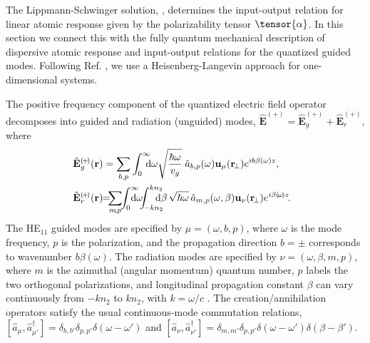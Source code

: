 \documentclass[aps,pra,twocolumn]{revtex4-1} %
\newcommand{\awg}{\hat{a}_{b,p}(\omega)}
\newcommand{\awr}{\hat{a}_{m,p}(\omega,\beta)}
\begin{document}
The Lippmann-Schwinger solution, , determines the input-output relation for linear atomic response given by the polarizability tensor $\tensor{\alpha}$.  
In this section we connect this with the fully quantum mechanical description of dispersive atomic response and input-output relations for the quantized guided modes.  
Following Ref. \cite{le_kien_spontaneous_2005}, we use a Heisenberg-Langevin approach for one-dimensional systems.  

The positive frequency component of the quantized electric field operator decomposes into guided and radiation (unguided) modes, $\hat{\mathbf{E}}^{(+)}=\hat{\mathbf{E}}_g^{(+)}+\hat{\mathbf{E}}_{r}^{(+)}$, where
\begin{subequations}
	\begin{align}
		\!\!\!\!\hat{\mathbf{E}}_g^{(\!+\!)}(\br) &= \sum_{b,p} \int_0^\infty\!\!\!\! \mathrm{d}\omega  \sqrt{\frac{ \hbar \omega}{ v_g}} \; \awg \mathbf{u}_\mu (\br\!_\perp) e^{i b\beta(\omega) z } ,\label{Eq::QuantizedElectricField} \\
		\!\!\!\!\hat{\mathbf{E}}_r^{(\!+\!)}(\br) &\!\!=\!\!\! \sum_{m\!,p}\!\! \int_0^{\infty}\!\!\!\!\!\! \mathrm{d}\omega\!\!\!   \int_{\!-kn_2}^{kn_2}\!\!\!\!\!\!\mathrm{d}\beta \, \sqrt{ \hbar \omega}\,\awr \mathbf{u}_\nu (\br\!_\perp) e^{i\beta(\!\omega\!) z }\!.
	\end{align}
\end{subequations}
The HE$_{11}$ guided modes are specified by $\mu =(\omega, b, p)$, where $\omega$ is the mode frequency,  $p$ is the polarization, and the propagation direction $b=\pm$ corresponds to wavenumber $b \beta (\omega)$.  The radiation modes are specified by  $\nu=(\omega, \beta, m, p)$, where $m$ is the azimuthal (angular momentum) quantum number, $p$ labels the two orthogonal polarizations, and longitudinal propagation constant $\beta$ can vary continuously from $-kn_2$ to $kn_2$, with $k = \omega/c$ \cite{sondergaard_general_2001,le_kien_spontaneous_2005}.  
The creation/annihilation operators satisfy the usual continuous-mode commutation relations, $[\hat{a}_\mu, \hat{a}^\dag_{\mu'} ] = \delta_{b,b'} \delta_{p,p'} \delta ( \omega - \omega ') $ and $[\hat{a}_\nu ,\hat{a}^\dag_{\nu'} ] = \delta_{m,m'} \delta_{p,p'} \delta ( \omega - \omega ')  \delta ( \beta - \beta') $.
\end{document}
